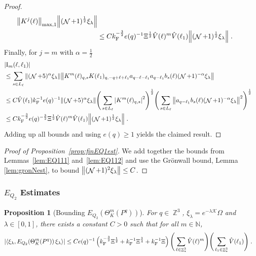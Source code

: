 \documentclass[12pt,a4paper]{article}
\numberwithin{equation}{section}
\newcommand{\cK}{\mathcal{K}}
\newcommand{\NNN}{\mathbb{N}}
\newcommand{\1}{\mathbb{I}}
\newcommand{\F}{\mathrm{F}}
\newcommand{\I}{\mathrm{I}}
\DeclareMathOperator{\Z}{\mathbb{Z}}
\DeclareMathOperator{\NN}{\mathcal{N}}
\newcommand{\half}{\frac{1}{2}}
\newcommand{\eva}[1]{\left\langle #1 \right\rangle}
\theoremstyle{plain}
\newtheorem{proposition}[theorem]{Proposition}
\theoremstyle{definition}
\theoremstyle{remark}
\theoremstyle{plain}
\theoremstyle{definition}
\theoremstyle{remark}
\begin{document}
\begin{proof}
\begin{align}
		\norm{ K^{j}(\ell)}_{\mathrm{max,1}}
		\norm{(\NN+1)^\half \xi_\lambda } \nonumber \\
	&\leq C k_{\F}^{-\frac 32} e(q)^{-1} \Xi^\half
		\hat{V}(\ell)^m
		\hat{V}(\ell_1)
		\norm{(\NN+1)^\half \xi_\lambda } \;.
\end{align}
Finally, for $ j = m $ with $ \alpha = \half $
\begin{align}
	&|\I_m(\ell, \ell_1)| \\
	&\leq \sum\limits_{s \in L_{\ell}} \norm{(\NN+5)^{\alpha} \xi_\lambda}\norm{ K^m(\ell)_{q,s} K(\ell_1)_{q,-q+\ell+\ell_1} a_{q-\ell-\ell_1} a_{q-\ell_1} b_{s}(\ell) (\NN+1)^{-\alpha} \xi_\lambda } \nonumber\\
	&\leq C \hat{V}(\ell_1) k_{\F}^{-1} e(q)^{-1}
		\norm{(\NN+5)^{\alpha} \xi_\lambda}
		\Bigg( \sum\limits_{s \in L_{\ell}} \abs{K^m(\ell)_{q,s}}^2\Bigg)^\half \Bigg(\sum\limits_{s \in L_{\ell}} \norm{ a_{q-\ell_1} b_s(\ell) (\NN+1)^{-\alpha} \xi_\lambda  }^2\Bigg)^\half \nonumber\\
	&\leq C k_{\F}^{-\frac 32} e(q)^{-\frac 32} \Xi^\half
		\hat{V}(\ell)^m
		\hat{V}(\ell_1)
		\norm{(\NN+1)^\half \xi_\lambda } \;. \label{eq:estEQ1123}
\end{align}
Adding up all bounds and using $ e(q) \ge 1 $ yields the claimed result.
\end{proof}



\begin{proof}[Proof of Proposition~\ref{prop:finEQ1est}]
We add together the bounds from Lemmas~\ref{lem:EQ111} and~\ref{lem:EQ112} and use the Gr\"onwall bound, Lemma \ref{lem:gronNest}, to bound $ \norm{(\NN+1)^2 \xi_\lambda} \le C $.
\end{proof}






\subsubsection{$E_{Q_2}$ Estimates}


\begin{proposition}[Bounding $E_{Q_2}(\Theta^m_{K}(P^q))$]\label{prop:finEQ2est}
For $ q \in \Z^3 $, $\xi_\lambda = e^{-\lambda \cK} \Omega$ and $ \lambda \in [0,1] $, there exists a constant $ C > 0 $ such that for all $ m \in \NNN $,
\begin{equation}\label{eq:finEQ2est}
	\abs{\eva{\xi_\lambda, E_{Q_2}\!\left(\Theta^m_K(P^q)\right)  \xi_\lambda}} 
	\leq C e(q)^{-1} \left( k_{\F}^{-\frac{3}{2}} \Xi^\half
		+ k_{\F}^{-1}\Xi^{\frac{3}{4}}
		+ k_{\F}^{-1}\Xi \right)
		\Bigg(\sum\limits_{\ell \in \Z^3_*} \hat{V}(\ell)^m\Bigg)\Bigg( \sum\limits_{\ell_1 \in \Z^3_*} \hat{V}(\ell_1) \Bigg) \;. \\
\end{equation}
\end{proposition}
\end{document}
